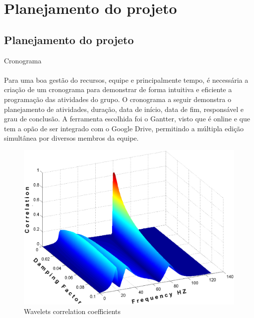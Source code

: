 \part{Planejamento do projeto}

\chapter[Planejamento do projeto]{Planejamento do projeto}


{\large{Cronograma}}\\ \\
\tab Para uma boa gestão do recursos, equipe e principalmente tempo, é necessária a criação de um cronograma para demonstrar de forma intuitiva e eficiente a programação das atividades do grupo. O cronograma a seguir demonstra o planejamento de atividades, duração, data de início, data de fim, responsável e grau de conclusão. A ferramenta escolhida foi o Gantter, visto que é online e que tem a opão de ser integrado com o Google Drive, permitindo a múltipla edição simultânea por diversos membros da equipe. \\
 
 \begin{figure}[h]
	\centering
	\label{fig01}
		\includegraphics[keepaspectratio=true,scale=0.3]{figuras/fig01.eps}
	\caption{Wavelets correlation coefficients}
\end{figure}